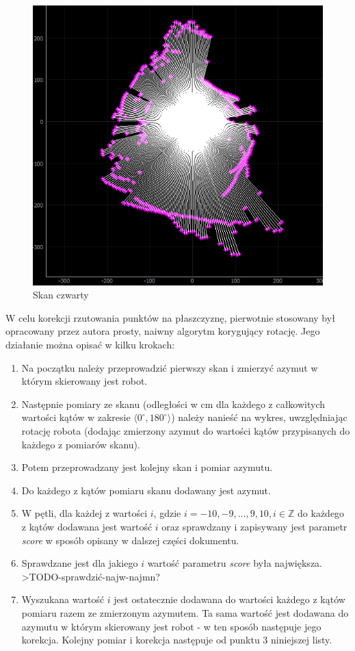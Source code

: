 \begin{figure}[ht]
	\centering
		\includegraphics[width=0.5\linewidth]{rys/ScanBot-12-calibrated-room-map4.PNG}
	\caption{Skan czwarty}
	\label{fig:overlapping-4}
\end{figure}

W celu korekcji rzutowania punktów na płaszczyznę, pierwotnie stosowany był opracowany przez autora prosty, naiwny algorytm korygujący rotację. Jego działanie można opisać w kilku krokach:
\begin{enumerate}
    \item Na początku należy przeprowadzić pierwszy skan i zmierzyć azymut w którym skierowany jest robot.
    \item Następnie pomiary ze skanu (odległości w cm dla każdego z całkowitych wartości kątów w zakresie $\langle0^{\circ}, 180^{\circ}\rangle$) należy nanieść na wykres, uwzględniając rotację robota (dodając zmierzony azymut do wartości kątów przypisanych do każdego z pomiarów skanu).
    \item Potem przeprowadzany jest kolejny skan i pomiar azymutu.
    \item Do każdego z kątów pomiaru skanu dodawany jest azymut.
    \item W pętli, dla każdej z wartości $i$, gdzie $i={-10,-9,...,9,10}, i \in \mathbb{Z}$ do każdego z kątów dodawana jest wartość $i$ oraz sprawdzany i zapisywany jest parametr \emph{score} w sposób opisany w dalszej części dokumentu.
    \item Sprawdzane jest dla jakiego $i$ wartość parametru \emph{score} była największa. >TODO-sprawdzić-najw-najmn? 
    \item Wyszukana wartość $i$ jest ostatecznie dodawana do wartości każdego z kątów pomiaru razem ze zmierzonym azymutem. Ta sama wartość jest dodawana do azymutu w którym skierowany jest robot - w ten sposób następuje jego korekcja. Kolejny pomiar i korekcja następuje od punktu 3 niniejszej listy.
\end{enumerate}

